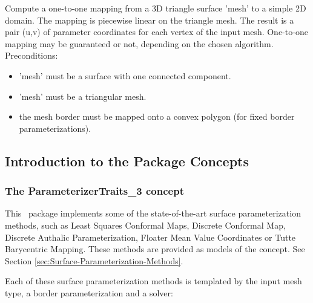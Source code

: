 {
Compute a one-to-one mapping from a 3D triangle surface 'mesh' to a simple 2D domain. The mapping is piecewise linear on the triangle mesh. The result is a pair (u,v) of parameter coordinates for each vertex of the input mesh.
One-to-one mapping may be guaranteed or not, depending on the chosen  algorithm.
Preconditions:\begin{itemize}
\item 'mesh' must be a surface with one connected component.\item 'mesh' must be a triangular mesh.\item the mesh border must be mapped onto a convex polygon (for fixed border parameterizations).\end{itemize}
}


\subsection{Introduction to the Package Concepts}

\subsubsection{The ParameterizerTraits\_3 concept}

This \cgal\ package implements some of the state-of-the-art
surface parameterization methods, such as Least Squares Conformal Maps,
Discrete Conformal Map, Discrete Authalic
Parameterization, Floater Mean Value Coordinates or Tutte Barycentric
Mapping. These methods are provided as models of the
 concept.
See Section \ref{sec:Surface-Parameterization-Methods}.

Each of these surface parameterization methods is templated by
the input mesh type, a border parameterization and a solver:

